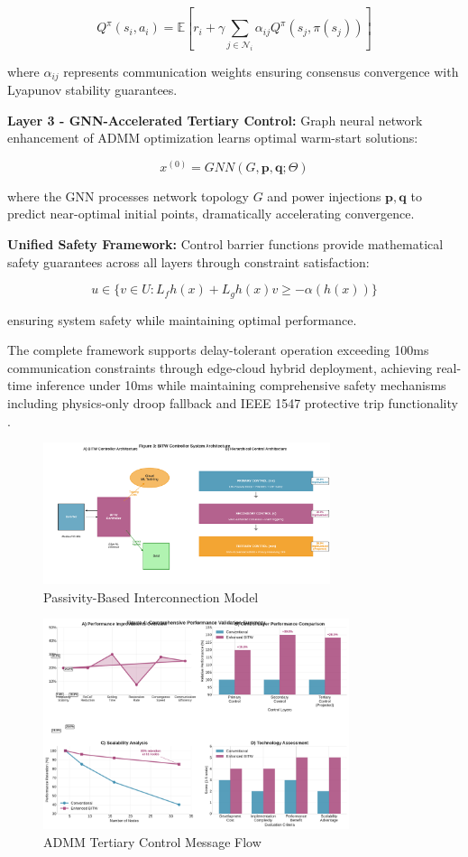 \documentclass[12pt]{article}
\begin{document}
$$Q^{\pi}(s_i, a_i) = \mathbb{E}[r_i + \gamma \sum_{j \in \mathcal{N}_i} \alpha_{ij} Q^{\pi}(s_j, \pi(s_j))]$$

where $\alpha_{ij}$ represents communication weights ensuring consensus convergence with Lyapunov stability guarantees.

\textbf{Layer 3 - GNN-Accelerated Tertiary Control:} Graph neural network enhancement of ADMM optimization \cite{chen2020,simpson2020} learns optimal warm-start solutions:

$$x^{(0)} = GNN(G, \mathbf{p}, \mathbf{q}; \Theta)$$

where the GNN processes network topology $G$ and power injections $\mathbf{p}, \mathbf{q}$ to predict near-optimal initial points, dramatically accelerating convergence.

\textbf{Unified Safety Framework:} Control barrier functions \cite{ames2017} provide mathematical safety guarantees across all layers through constraint satisfaction:

$$u \in \{v \in U : L_f h(x) + L_g h(x) v \geq -\alpha(h(x))\}$$

ensuring system safety while maintaining optimal performance.

The complete framework supports delay-tolerant operation exceeding 100ms communication constraints through edge-cloud hybrid deployment, achieving real-time inference under 10ms while maintaining comprehensive safety mechanisms including physics-only droop fallback and IEEE 1547 protective trip functionality \cite{ieee1547}.

\begin{figure}[H]
\centering
\includegraphics[width=0.75\textwidth]{figure3_system_architecture.pdf}
\caption{Passivity-Based Interconnection Model}
\end{figure}

\begin{figure}[H]
\centering
\includegraphics[width=0.8\textwidth]{figure4_performance_summary.pdf}
\caption{ADMM Tertiary Control Message Flow}
\end{figure}
\end{document}
